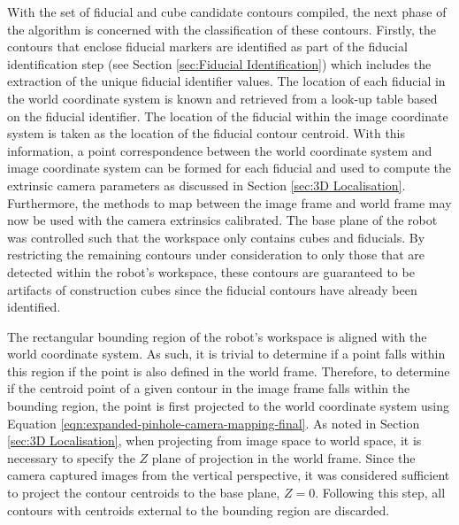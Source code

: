 With the set of fiducial and cube candidate contours compiled, the next phase of the algorithm is concerned with the classification of these contours. Firstly, the contours that enclose fiducial markers are identified as part of the fiducial identification step (see Section \ref{sec:Fiducial Identification}) which includes the extraction of the unique fiducial identifier values. The location of each fiducial in the world coordinate system is known and retrieved from a look-up table based on the fiducial identifier. The location of the fiducial within the image coordinate system is taken as the location of the fiducial contour centroid. With this information, a point correspondence between the world coordinate system and image coordinate system can be formed for each fiducial and used to compute the extrinsic camera parameters as discussed in Section \ref{sec:3D Localisation}. Furthermore, the methods to map between the image frame and world frame may now be used with the camera extrinsics calibrated. The base plane of the robot was controlled such that the workspace only contains cubes and fiducials. By restricting the remaining contours under consideration to only those that are detected within the robot's workspace, these contours are guaranteed to be artifacts of construction cubes since the fiducial contours have already been identified.

The rectangular bounding region of the robot's workspace is aligned with the world coordinate system. As such, it is trivial to determine if a point falls within this region if the point is also defined in the world frame. Therefore, to determine if the centroid point of a given contour in the image frame falls within the bounding region, the point is first projected to the world coordinate system using Equation \ref{eqn:expanded-pinhole-camera-mapping-final}. As noted in Section \ref{sec:3D Localisation}, when projecting from image space to world space, it is necessary to specify the $Z$ plane of projection in the world frame. Since the camera captured images from the vertical perspective, it was considered sufficient to project the contour centroids to the base plane, $Z=0$. Following this step, all contours with centroids external to the bounding region are discarded.

